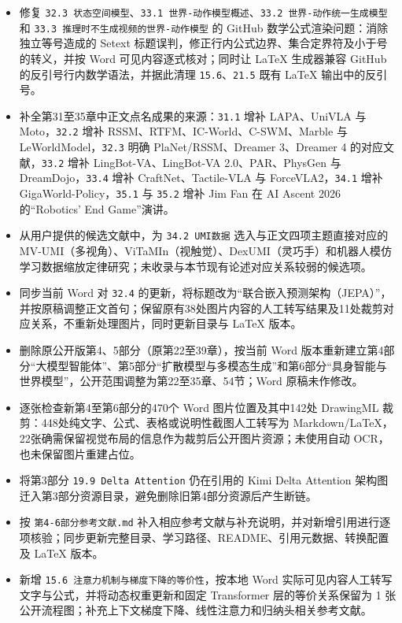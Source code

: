 \begin{itemize}
\item
  修复 \texttt{32.3\ 状态空间模型}、\texttt{33.1\ 世界-动作模型概述}、\texttt{33.2\ 世界-动作统一生成模型} 和 \texttt{33.3\ 推理时不生成视频的世界-动作模型} 的 GitHub 数学公式渲染问题：消除独立等号造成的 Setext 标题误判，修正行内公式边界、集合定界符及小于号的转义，并按 Word 可见内容逐式核对；同时让 LaTeX 生成器兼容 GitHub 的反引号行内数学语法，并据此清理 \texttt{15.6}、\texttt{21.5} 既有 LaTeX 输出中的反引号。
\item
  补全第31至35章中正文点名成果的来源：\texttt{31.1} 增补 LAPA、UniVLA 与 Moto，\texttt{32.2} 增补 RSSM、RTFM、IC-World、C-SWM、Marble 与 LeWorldModel，\texttt{32.3} 明确 PlaNet/RSSM、Dreamer 3、Dreamer 4 的对应文献，\texttt{33.2} 增补 LingBot-VA、LingBot-VA 2.0、PAR、PhysGen 与 DreamDojo，\texttt{33.4} 增补 CraftNet、Tactile-VLA 与 ForceVLA2，\texttt{34.1} 增补 GigaWorld-Policy，\texttt{35.1} 与 \texttt{35.2} 增补 Jim Fan 在 AI Ascent 2026 的``Robotics' End Game''演讲。
\item
  从用户提供的候选文献中，为 \texttt{34.2\ UMI数据} 选入与正文四项主题直接对应的 MV-UMI（多视角）、ViTaMIn（视触觉）、DexUMI（灵巧手）和机器人模仿学习数据缩放定律研究；未收录与本节现有论述对应关系较弱的候选项。
\item
  同步当前 Word 对 \texttt{32.4} 的更新，将标题改为``联合嵌入预测架构（JEPA）''，并按原稿调整正文首句；保留原有38处图片内容的人工转写结果及11处裁剪对应关系，不重新处理图片，同时更新目录与 LaTeX 版本。
\item
  删除原公开版第4、5部分（原第22至39章），按当前 Word 版本重新建立第4部分``大模型智能体''、第5部分``扩散模型与多模态生成''和第6部分``具身智能与世界模型''，公开范围调整为第22至35章、54节；Word 原稿未作修改。
\item
  逐张检查新第4至第6部分的470个 Word 图片位置及其中142处 DrawingML 裁剪：448处纯文字、公式、表格或说明性截图人工转写为 Markdown/LaTeX，22张确需保留视觉布局的信息作为裁剪后公开图片资源；未使用自动 OCR，也未保留图片重建占位。
\item
  将第3部分 \texttt{19.9\ Delta\ Attention} 仍在引用的 Kimi Delta Attention 架构图迁入第3部分资源目录，避免删除旧第4部分资源后产生断链。
\item
  按 \texttt{第4-6部分参考文献.md} 补入相应参考文献与补充说明，并对新增引用进行逐项核验；同步更新完整目录、学习路径、README、引用元数据、转换配置及 LaTeX 版本。
\item
  新增 \texttt{15.6\ 注意力机制与梯度下降的等价性}，按本地 Word 实际可见内容人工转写文字与公式，并将动态权重更新和固定 Transformer 层的等价关系保留为 1 张公开流程图；补充上下文梯度下降、线性注意力和归纳头相关参考文献。

\end{itemize}
